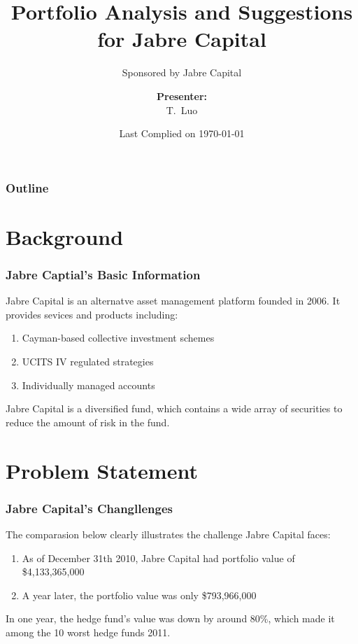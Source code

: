 \documentclass[compress,handout,10pt]{beamer}
\title{{\color{blue} \LARGE Portfolio Analysis and Suggestions for Jabre Capital\newline} }
\subtitle{{\color{red} \large Sponsored by Jabre Capital} }
\author{ 
    {\bf{Presenter:}} \\ 
T.~Luo \\ 
    \vspace{5pt}
}
\institute{JHU AMS 2012 FALL}
\date{\mygreen Last Complied on \today}
\let\olditem\item
\renewcommand{\item}{\setlength{\itemsep}{0.5\baselineskip}\olditem}
\begin{document}
\begin{frame}[plain]
    \titlepage
\end{frame}

\begin{frame}
    \frametitle{Outline}
    \tableofcontents
\end{frame}

\section{Background}

\begin{frame}
    \frametitle{Jabre Captial's Basic Information}
    Jabre Capital is an alternatve asset management platform founded in 2006. It provides sevices and products including:
    \vspace{7pt}
             \begin{enumerate}
                 \item Cayman-based collective investment schemes
                 \item UCITS IV regulated strategies 
                 \item Individually managed accounts
		 \end{enumerate}
\color{red}Jabre Capital is a diversified fund, which contains a wide array of securities to reduce the amount of risk in the fund.
\end{frame}
     
\section{Problem Statement}
\begin{frame}
    \frametitle{Jabre Capital's Changllenges}
The comparasion below clearly illustrates the challenge Jabre Capital faces:
\vspace{7pt}    
\begin{enumerate}
        \item As of December 31th 2010, Jabre Capital had portfolio value of \$4,133,365,000
	\item A year later, the portfolio value was only \$793,966,000
     \end{enumerate}
\color{red}    In one year, the hedge fund's value was down by around 80\%, which made it among the 10 worst hedge funds 2011.    
\end{frame}
\end{document}

